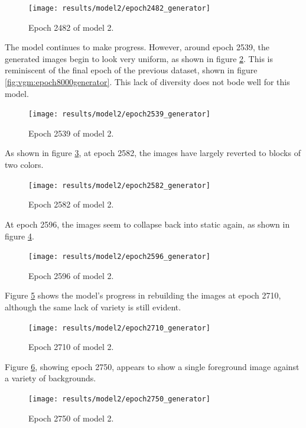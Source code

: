 \documentclass[11pt,letterpaper]{article}
\begin{document}
				\begin{figure}
					\centering
					\texttt{[image: results/model2/epoch2482\_generator]}
					\caption{Epoch 2482 of model 2.}
					\label{fig:cgvg:epoch2482generator}
				\end{figure}

				The model continues to make progress.
				However, around epoch 2539, the generated images begin to look very uniform, as shown in figure \ref{fig:cgvg:epoch2539generator}.
				This is reminiscent of the final epoch of the previous dataset, shown in figure \ref{fig:vgm:epoch8000generator}.
				This lack of diversity does not bode well for this model.
				\begin{figure}
					\centering
					\texttt{[image: results/model2/epoch2539\_generator]}
					\caption{Epoch 2539 of model 2.}
					\label{fig:cgvg:epoch2539generator}
				\end{figure}

				As shown in figure \ref{fig:cgvg:epoch2582generator}, at epoch 2582, the images have largely reverted to blocks of two colors.
				\begin{figure}
					\centering
					\texttt{[image: results/model2/epoch2582\_generator]}
					\caption{Epoch 2582 of model 2.}
					\label{fig:cgvg:epoch2582generator}
				\end{figure}

				At epoch 2596, the images seem to collapse back into static again, as shown in figure \ref{fig:cgvg:epoch2596generator}.
				\begin{figure}
					\centering
					\texttt{[image: results/model2/epoch2596\_generator]}
					\caption{Epoch 2596 of model 2.}
					\label{fig:cgvg:epoch2596generator}
				\end{figure}

				Figure \ref{fig:cgvg:epoch2710generator} shows the model's progress in rebuilding the images at epoch 2710, although the same lack of variety is still evident.
				\begin{figure}
					\centering
					\texttt{[image: results/model2/epoch2710\_generator]}
					\caption{Epoch 2710 of model 2.}
					\label{fig:cgvg:epoch2710generator}
				\end{figure}

				Figure \ref{fig:cgvg:epoch2750generator}, showing epoch 2750, appears to show a single foreground image against a variety of backgrounds.
				\begin{figure}
					\centering
					\texttt{[image: results/model2/epoch2750\_generator]}
					\caption{Epoch 2750 of model 2.}
					\label{fig:cgvg:epoch2750generator}
				\end{figure}
\end{document}
